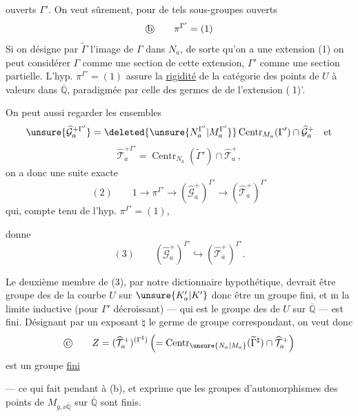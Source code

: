 ouverts $\Gamma'$. On veut sûrement, pour de tels sous-groupes ouverts
\[
\text{\textcircled{b}}\qquad \pi^{\Gamma'}=(1)
\]
Si on désigne par $\widetilde{\Gamma}$ l'image de $\Gamma$ dans $N_a$, de sorte qu'on a une extension
(1)\quad
{}
on peut considérer $\Gamma$ comme une section de cette extension, $\Gamma'$ comme une section partielle. L'hyp. $\pi^{\Gamma'}=(1)$ assure la \uline{rigidité} de la catégorie des points de $U$ à valeurs dans $\overline{\mathbb Q}$, paradigmée par celle des germes de  de l'extension \textcircled{(1)'}.

On peut aussi regarder les ensembles
\[
\unsure{\widehat{\mathcal G}_a^{+\Gamma'}}
=
\deleted{\unsure{N_a^{\Gamma'}|M_a^{\Gamma'}}}
\operatorname{Centr}_{M_a}(\Gamma')\cap\widehat{\mathcal G}_a^+
\quad\text{et}
\]
\[
\widehat{\mathcal T}_a^{+\Gamma'}
=\operatorname{Centr}_{N_a}(\widetilde{\Gamma}')\cap\widehat{\mathcal T}_a^+,
\]
 on a donc une suite exacte
\[
(2)\qquad 1\longrightarrow\pi^{\Gamma'}\longrightarrow
(\widehat{\mathcal G}_a^+)^{\Gamma'}\longrightarrow
(\widehat{\mathcal T}_a^+)^{\Gamma'}
\]
qui, compte tenu de l'hyp. $\pi^{\Gamma'}=(1)$,

donne
\[
(3)\qquad (\widehat{\mathcal G}_a^+)^{\Gamma'}
\hookrightarrow (\widehat{\mathcal T}_a^+)^{\Gamma'}.
\]

Le deuxième membre de (3), par notre dictionnaire hypothétique, devrait être   groupe des  de la courbe $U$ sur $\unsure{K'_a|K'}$ donc être un groupe fini, et $\overline{\mathrm m}$  la limite inductive (pour $\Gamma'$ décroissant) --- qui est le groupe des  de $U$ sur $\overline{\mathbb Q}$ --- est fini. Désignant par un exposant $\natural$ le germe de groupe correspondant, on veut donc
\[
\text{\textcircled{c}}\qquad
Z=(\widehat{\mathcal T}_a^+)^{(\Gamma^{\natural})}
\left(=\operatorname{Centr}_{\unsure{N_a|M_a}}
(\widetilde{\Gamma}^{\natural})\cap\widehat{\mathcal T}_a^+\right)
\]
est un groupe \uline{fini}

--- ce qui fait pendant à (b), et exprime que les groupes d'automorphismes des points de $M_{g,\nu\overline{\mathbb Q}}$ sur $\overline{\mathbb Q}$ sont finis.

